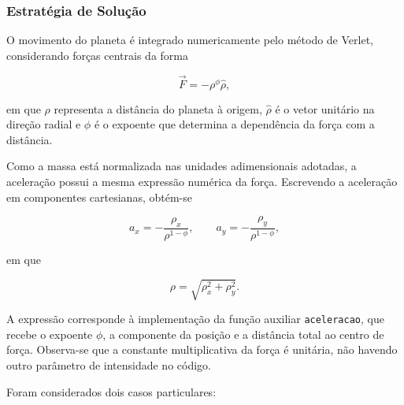 \documentclass[12pt,a4paper]{article}
\begin{document}
\subsubsection{Estratégia de Solução}

O movimento do planeta é integrado numericamente pelo método de Verlet, considerando forças centrais da forma

\begin{equation}
    \vec{F}=-\rho^\phi\hat{\rho},
\end{equation}

em que $\rho$ representa a distância do planeta à origem, $\hat{\rho}$ é o vetor unitário na direção radial e $\phi$ é o expoente que determina a dependência da força com a distância.

Como a massa está normalizada nas unidades adimensionais adotadas, a aceleração possui a mesma expressão numérica da força. Escrevendo a aceleração em componentes cartesianas, obtém-se

\begin{equation}
    a_x=-\frac{\rho_x}{\rho^{1-\phi}},
    \qquad
    a_y=-\frac{\rho_y}{\rho^{1-\phi}},
\end{equation}

em que

\begin{equation}
    \rho=\sqrt{\rho_x^2+\rho_y^2}.
\end{equation}

A expressão corresponde à implementação da função auxiliar \texttt{aceleracao}, que recebe o expoente $\phi$, a componente da posição e a distância total ao centro de força. Observa-se que a constante multiplicativa da força é unitária, não havendo outro parâmetro de intensidade no código.

Foram considerados dois casos particulares:
\end{document}
